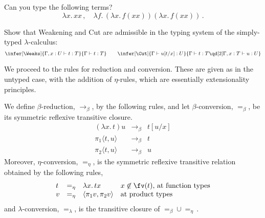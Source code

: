\documentclass{svmult}
\begin{document}
%
\begin{myexercise}
Can you type the following terms?
\[ \lambda x. \, xx\,,\quad \lambda f. \, (\lambda x.\, f(x x)) (\lambda x. \, f(x x))\,. \]
\end{myexercise}
\begin{myexercise} Show that Weakening and Cut are admissible in the typing system of the simply-typed $\lambda$-calculus:
    \[ \infer[\Weaks]{\Gamma,x:U\vdash t:T}{\Gamma\vdash t:T}\qquad
    \infer[\Cut]{\Gamma\vdash u[t/x]:U}{\Gamma\vdash t:T\qd[2]\Gamma,x:T\vdash u:U} \]
\end{myexercise}
%
We proceed to the rules for reduction and conversion. These are given as in the untyped case, with the addition of $\eta$-rules, which are essentially
extensionality principles.
\begin{mydefinition}
We define $\beta$-reduction, $\longrightarrow_\beta$, by the following rules, and let $\beta$-conversion, $=_\beta$, be its symmetric reflexive
transitive closure.
\[ \begin{array}{lcl}
(\lambda x. \, t ) u & \longrightarrow_\beta & t[u/x] \\
\pi_1 \langle t, u \rangle & \longrightarrow_\beta & t \\
\pi_2 \langle t, u \rangle & \longrightarrow_\beta & u
\end{array} \]
Moreover, $\eta$-conversion, $=_\eta$, is the symmetric reflexive transitive relation obtained by the following rules,
\[ \begin{array}{lcl@{\quad}l}
t & =_\eta & \lambda x.\, tx & \mbox{$x\not\in\fv(t)$, at function  types} \\
v & =_\eta & \langle \pi_1 v, \pi_2 v \rangle & \mbox{at product types}
\end{array} \]
and $\lambda$-conversion, $=_\lambda$, is the transitive closure of $=_\beta\cup=_\eta$\,.\deq
\end{mydefinition}
\end{document}

